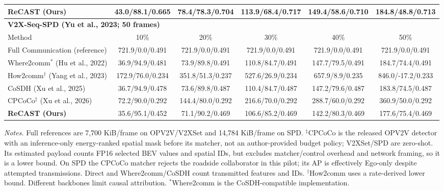 \begin{table}[t]
\begin{tabular}{lccccc}
\textbf{ReCAST (Ours)} & 43.0/88.1/0.665 & 78.4/78.3/0.704 & 113.9/68.4/0.717 & 149.4/58.6/0.710 & 184.8/48.8/0.713 \\
\midrule
\multicolumn{6}{l}{\textbf{V2X-Seq-SPD (Yu et al., 2023; 50 frames)}} \\
Method & 10\% & 20\% & 30\% & 40\% & 50\% \\
\midrule
Full Communication (reference) & 721.9/0.0/0.491 & 721.9/0.0/0.491 & 721.9/0.0/0.491 & 721.9/0.0/0.491 & 721.9/0.0/0.491 \\
Where2comm$^{*}$ (Hu et al., 2022) & 36.9/94.9/0.481 & 73.9/89.8/0.491 & 110.8/84.7/0.491 & 147.7/79.5/0.491 & 184.7/74.4/0.491 \\
How2comm$^{\dagger}$ (Yang et al., 2023) & 172.9/76.0/0.234 & 351.8/51.3/0.237 & 527.6/26.9/0.234 & 657.9/8.9/0.235 & 846.0/-17.2/0.233 \\
CoSDH (Xu et al., 2025) & 36.7/94.9/0.478 & 73.6/89.8/0.487 & 110.4/84.7/0.487 & 147.2/79.6/0.487 & 183.8/74.5/0.487 \\
CPCoCo$^{\ddagger}$ (Xu et al., 2026) & 72.2/90.0/0.292 & 144.4/80.0/0.292 & 216.6/70.0/0.292 & 288.7/60.0/0.292 & 360.9/50.0/0.292 \\
\textbf{ReCAST (Ours)} & 35.6/95.1/0.452 & 71.1/90.2/0.469 & 106.6/85.2/0.469 & 142.2/80.3/0.469 & 177.6/75.4/0.469 \\
\bottomrule
\end{tabular}
\vspace{2pt}
\begin{minipage}{.98\textwidth}\scriptsize
\textit{Notes.} Full references are 7,700 KiB/frame on OPV2V/V2XSet and 14,784 KiB/frame on SPD. $^{\ddagger}$CPCoCo is the released OPV2V detector with an inference-only energy-ranked spatial mask before its matcher, not an author-provided budget policy; V2XSet/SPD are zero-shot. Its estimated payload counts FP16 selected BEV values and spatial IDs, but excludes matcher/control overhead and network framing, so it is a lower bound. On SPD the CPCoCo matcher rejects the roadside collaborator in this pilot; its AP is effectively Ego-only despite attempted transmissions. Direct and Where2comm/CoSDH count transmitted features and IDs. $^{\dagger}$How2comm uses a rate-derived lower bound. Different backbones limit causal attribution. $^{*}$Where2comm is the CoSDH-compatible implementation.
\end{minipage}
\end{table}
